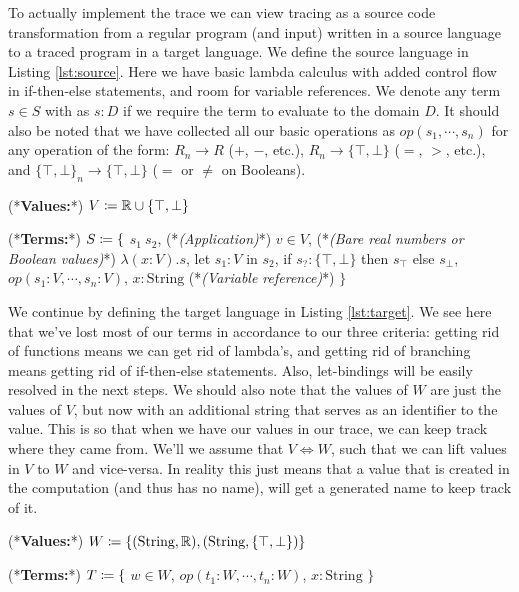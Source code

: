     To actually implement the trace we can view tracing as a source code transformation from a regular program (and input) written in a source language to a traced program in a target language.
    We define the source language in Listing \ref{lst:source}.
    Here we have basic lambda calculus with added control flow in if-then-else statements, and room for variable references.
    We denote any term ${s\in S}$ with as ${s:D}$ if we require the term to evaluate to the domain $D$.
    It should also be noted that we have collected all our basic operations as ${op(s_1,\dotsb,s_n)}$ for any operation of the form: ${R_n\to R}$ ($+$, $-$, etc.), $R{_n\to\{\top,\bot\}}$ ($=$, $>$, etc.), and ${\{\top,\bot\}_n\to\{\top,\bot\}}$ ($=$ or $\neq$ on Booleans).
    
    \begin{deflisting}[caption=Source Language,label=lst:source,gobble=8]
        (*\textbf{Values:}*)
            $V\df\mathbb{R}\cup\{\top,\bot\}$
        
        (*\textbf{Terms:}*)
            $S\df\{$
                $s_1\ s_2$, (*\textit{(Application)}*)
                $v\in V$, (*\textit{(Bare real numbers or Boolean values)}*)
                $\lambda(x:V).s$,
                let $s_1:V$ in $s_2$,
                if $s_?:\{\top,\bot\}$ then $s_\top$ else $s_\bot$,
                $op(s_1:V,\dotsb,s_n:V)$,
                $x:\text{String}$ (*\textit{(Variable reference)}*)
            $\}$
    \end{deflisting}

    We continue by defining the target language in Listing \ref{lst:target}.
    We see here that we've lost most of our terms in accordance to our three criteria: getting rid of functions means we can get rid of lambda's, and getting rid of branching means getting rid of if-then-else statements.
    Also, let-bindings will be easily resolved in the next steps.
    We should also note that the values of $W$ are just the values of $V$, but now with an additional string that serves as an identifier to the value.
    This is so that when we have our values in our trace, we can keep track where they came from.
    We'll we assume that $V\Leftrightarrow W$, such that we can lift values in $V$ to $W$ and vice-versa.
    In reality this just means that a value that is created in the computation (and thus has no name), will get a generated name to keep track of it.

    \begin{deflisting}[caption=Target Language,label=lst:target,gobble=8]
        (*\textbf{Values:}*)
            $W\df\{(\text{String},\mathbb{R}),(\text{String},\{\top,\bot\})\}$

        (*\textbf{Terms:}*)
            $T\df\{$
                $w\in W$,
                $op(t_1:W,\dotsb,t_n:W)$,
                $x:\text{String}$
            $\}$
    \end{deflisting}

